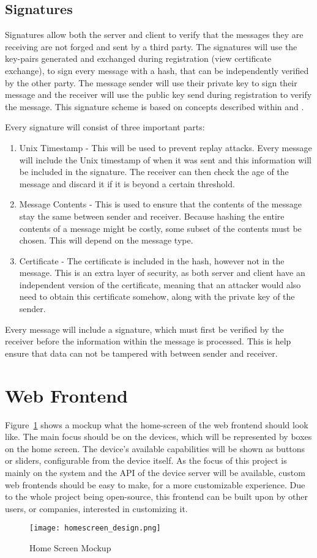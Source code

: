 \subsection{Signatures}
Signatures allow both the server and client to verify that the messages they are receiving are not forged and sent by a third party. The signatures will use the key-pairs generated and exchanged during registration (view certificate exchange), to sign every message with a hash, that can be independently verified by the other party. The message sender will use their private key to sign their message and the receiver will use the public key send during registration to verify the message. This signature scheme is based on concepts described within \cite{disSysConceptsDesign} and \cite{disSysPrinciples}.

Every signature will consist of three important parts:
\begin{enumerate}
    \item Unix Timestamp - This will be used to prevent replay attacks. Every message will include the Unix timestamp of when it was sent and this information will be included in the signature. The receiver can then check the age of the message and discard it if it is beyond a certain threshold.
    \item Message Contents - This is used to ensure that the contents of the message stay the same between sender and receiver. Because hashing the entire contents of a message might be costly, some subset of the contents must be chosen. This will depend on the message type.
    \item Certificate - The certificate is included in the hash, however not in the message. This is an extra layer of security, as both server and client have an independent version of the certificate, meaning that an attacker would also need to obtain this certificate somehow, along with the private key of the sender.
\end{enumerate}

Every message will include a signature, which must first be verified by the receiver before the information within the message is processed. This is help ensure that data can not be tampered with between sender and receiver.


\section{Web Frontend} \label{sec:chapdesign:frontend}
Figure~\ref{fig:home_screen_mockup} shows a mockup what the home-screen of the web frontend should look like. The main focus should be on the devices, which will be represented by boxes on the home screen. The device's available capabilities will be shown as buttons or sliders, configurable from the device itself. As the focus of this project is mainly on the system and the API of the device server will be available, custom web frontends should be easy to make, for a more customizable experience. Due to the whole project being open-source, this frontend can be built upon by other users, or companies, interested in customizing it.

\begin{figure}[h]
\caption{Home Screen Mockup}
\texttt{[image: homescreen\_design.png]}
\label{fig:home_screen_mockup}
\end{figure}


